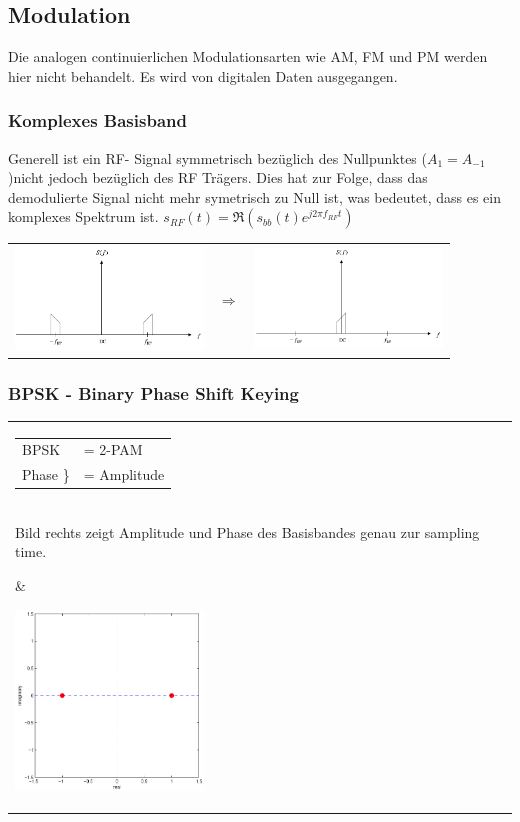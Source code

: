 \subsection{Modulation}
Die analogen continuierlichen Modulationsarten wie AM, FM und PM werden hier
nicht behandelt. Es wird von digitalen Daten ausgegangen.

\subsubsection{Komplexes Basisband }
Generell ist ein RF- Signal symmetrisch bezüglich des Nullpunktes
($A_1=A_{-1}$)nicht jedoch bezüglich des RF Trägers. Dies hat zur Folge, dass
das demodulierte Signal nicht mehr symetrisch zu Null ist, was bedeutet, dass
es ein komplexes Spektrum ist. $s_{RF}(t)=\Re(s_{bb}(t)e^{j2\pi f_{RF}t})$\\
\begin{tabular}{lll}
	\parbox{5cm}{
		\includegraphics[width=5cm]{./bilder/modulation_RFSpektrum.png}
	}
	&$\Longrightarrow$
	&\parbox{5cm}{
		\includegraphics[width=5cm]{./bilder/modulation_BBSpektrum.png}
	}
\end{tabular}

\subsubsection{BPSK - Binary Phase Shift Keying  }
\begin{tabular}{ll}
	\parbox{10cm}{
		\begin{tabular}{ll}
			BPSK&= 2-PAM \\
			Phase $\in \{-180^o, 0$\} &= Amplitude $\in \{-1, 1\}$
		\end{tabular}\\
		Bild rechts zeigt Amplitude und Phase des Basisbandes genau zur sampling
		time.\\
	}
	&
	\parbox{5cm}{
		\includegraphics[width=5cm]{./bilder/modulation_constellationBPSK.png}
	}
\end{tabular}
